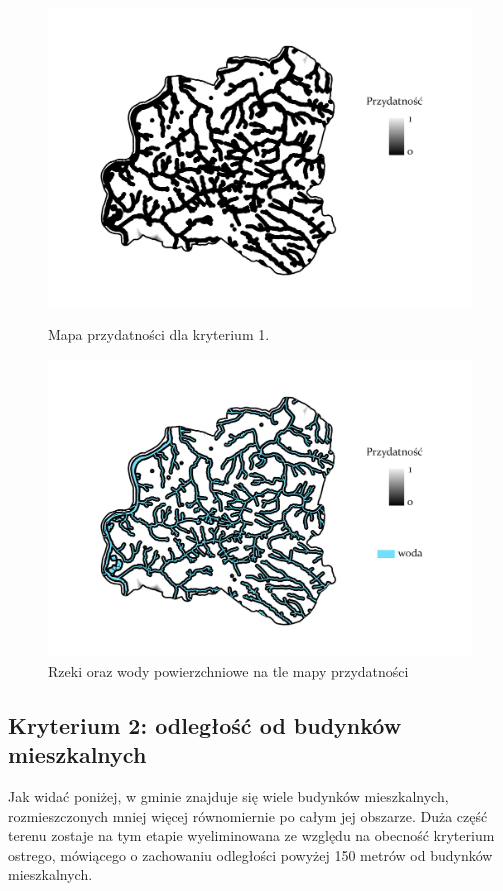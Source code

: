 \documentclass{article}
\begin{document}
\begin{figure}[H]
    \begin{minipage}[t]{0.48\textwidth}
        \centering
        \includegraphics[width=\linewidth]{img/plesna-kryterium1-layout.jpg}
        \caption{Mapa przydatności dla kryterium 1.}
        \label{fig:kryterium1-layout}
    \end{minipage}
    \hfill
    \begin{minipage}[t]{0.48\textwidth}
        \centering
        \includegraphics[width=\linewidth]{img/plesna-kryterium1-woda.jpg}
        \caption{Rzeki oraz wody powierzchniowe na tle mapy przydatności}
        \label{fig:kryterium1-woda}
    \end{minipage}
\end{figure}
\newpage

\subsection{Kryterium 2: odległość od budynków mieszkalnych}
Jak widać poniżej, w gminie znajduje się wiele budynków mieszkalnych, rozmieszczonych mniej więcej równomiernie po całym jej obszarze. Duża część terenu zostaje na tym etapie wyeliminowana ze względu na obecność kryterium ostrego, mówiącego o zachowaniu odległości powyżej 150 metrów od budynków mieszkalnych.
\end{document}
